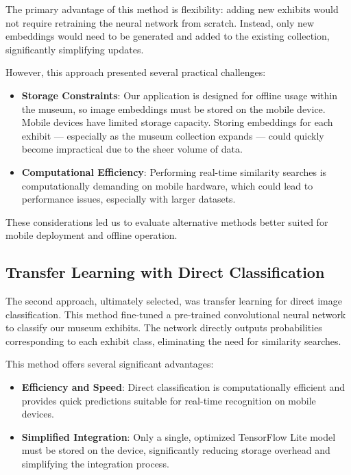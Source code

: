 The primary advantage of this method is flexibility: adding new exhibits would not require retraining the neural network from scratch. Instead, only new embeddings would need to be generated and added to the existing collection, significantly simplifying updates.

However, this approach presented several practical challenges:

\begin{itemize}
    \item \textbf{Storage Constraints}: Our application is designed for offline usage within the museum, so image embeddings must be stored on the mobile device. Mobile devices have limited storage capacity. Storing embeddings for each exhibit --- especially as the museum collection expands --- could quickly become impractical due to the sheer volume of data.
    \item \textbf{Computational Efficiency}: Performing real-time similarity searches is computationally demanding on mobile hardware, which could lead to performance issues, especially with larger datasets.
\end{itemize}

These considerations led us to evaluate alternative methods better suited for mobile deployment and offline operation.

\subsection{Transfer Learning with Direct Classification}

The second approach, ultimately selected, was transfer learning for direct image classification. This method fine-tuned a pre-trained convolutional neural network to classify our museum exhibits. The network directly outputs probabilities corresponding to each exhibit class, eliminating the need for similarity searches.

This method offers several significant advantages:

\begin{itemize}
    \item \textbf{Efficiency and Speed}: Direct classification is computationally efficient and provides quick predictions suitable for real-time recognition on mobile devices.
    \item \textbf{Simplified Integration}: Only a single, optimized TensorFlow Lite model must be stored on the device, significantly reducing storage overhead and simplifying the integration process.
\end{itemize}

